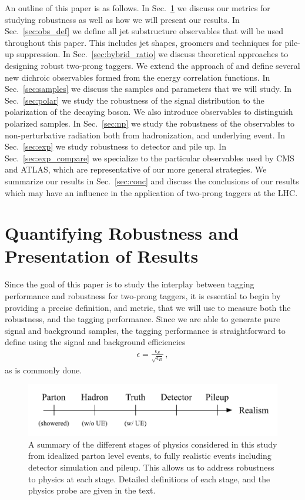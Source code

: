 \documentclass[11pt,letterpaper]{article}
\DeclareRobustCommand{\Sec}[1]{Sec.~\ref{#1}}
\begin{document}
An outline of this paper is as follows. In \Sec{sec:pres} we discuss our metrics for studying robustness as well as how we will present our results. In \Sec{sec:obs_def} we define all jet substructure observables that will be used throughout this paper. This includes jet shapes, groomers and techniques for pile-up suppression. In \Sec{sec:hybrid_ratio} we discuss theoretical approaches to designing robust two-prong taggers. We extend the approach of \cite{Salam:2016yht} and define several new dichroic observables formed from the energy correlation functions.  In \Sec{sec:samples} we discuss the samples and parameters that we will study. In \Sec{sec:polar} we study the robustness of the signal distribution to the polarization of the decaying boson. We also introduce observables to distinguish polarized samples. In \Sec{sec:np} we study the robustness of the observables to non-perturbative radiation both from hadronization, and underlying event. In \Sec{sec:exp} we study robustness to detector and pile up. In \Sec{sec:exp_compare} we specialize to the particular observables used by CMS and ATLAS, which are representative of our more general strategies. We summarize our results in \Sec{sec:conc} and discuss the conclusions of our results which may have an influence in the application of two-prong taggers at the LHC.

\section{Quantifying Robustness and Presentation of Results}\label{sec:pres}


Since the goal of this paper is to study the interplay between tagging performance and robustness for two-prong taggers, it is essential to begin by providing a precise definition, and metric, that we will use to measure both the robustness, and the tagging performance.
Since we are able to generate pure signal and background samples, the tagging performance is straightforward to define using the signal and background efficiencies 
\begin{align}
\epsilon=\frac{\epsilon_S}{\sqrt{\epsilon_B}}\,,
\end{align}
as is commonly done.

\begin{figure}[t!]
\begin{center}
\includegraphics[width=0.75\columnwidth]{figures/realism_levels}
\end{center}
\caption{A summary of the different stages of physics considered in this study from idealized parton level events, to fully realistic events including detector simulation and pileup. This allows us to address robustness to physics at each stage. Detailed definitions of each stage, and the physics probe are given in the text.  }
\label{fig:realism}
\end{figure}
\end{document}
